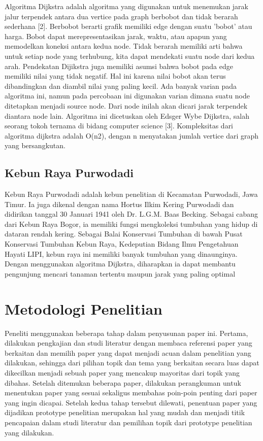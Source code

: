\documentclass[conference]{IEEEtran}
\begin{document}
Algoritma Dijkstra adalah algoritma yang digunakan untuk
menemukan jarak jalur terpendek antara dua vertice pada
graph berbobot dan tidak berarah sederhana [2]. Berbobot
berarti grafik memiliki edge dengan suatu ’bobot’ atau harga.
Bobot dapat merepresentasikan jarak, waktu, atau apapun
yang memodelkan koneksi antara kedua node. Tidak berarah
memiliki arti bahwa untuk setiap node yang terhubung, kita
dapat mendekati suatu node dari kedua arah. Pendekatan Dijikstra
juga memiliki asumsi bahwa bobot pada edge memiliki
nilai yang tidak negatif. Hal ini karena nilai bobot akan
terus dibandingkan dan diambil nilai yang paling kecil. Ada
banyak varian pada algoritma ini, namun pada percobaan
ini digunakan varian dimana suatu node ditetapkan menjadi
source node. Dari node inilah akan dicari jarak terpendek
diantara node lain. Algoritma ini dicetuskan oleh Edsger
Wybe Dijkstra, salah seorang tokoh ternama di bidang computer
science [3]. Kompleksitas dari algoritma dijkstra adalah
O(n2), dengan n menyatakan jumlah vertice dari graph yang
bersangkutan.

\subsection{Kebun Raya Purwodadi}

Kebun Raya Purwodadi adalah kebun penelitian di Kecamatan
Purwodadi, Jawa Timur. Ia juga dikenal dengan nama
Hortus Ilkim Kering Purwodadi dan didirikan tanggal 30 Januari
1941 oleh Dr. L.G.M. Baas Becking. Sebagai cabang dari
Kebun Raya Bogor, ia memiliki fungsi mengkoleksi tumbuhan
yang hidup di dataran rendah kering. Sebagai Balai Konservasi
Tumbuhan di bawah Pusat Konservasi Tumbuhan Kebun Raya,
Kedeputian Bidang Ilmu Pengetahuan Hayati LIPI, kebun raya
ini memiliki banyak tumbuhan yang dinaunginya. Dengan
menggunakan algoritma Dijkstra, diharapkan ia dapat membantu
pengunjung mencari tanaman tertentu maupun jarak
yang paling optimal



\section{Metodologi Penelitian}
Peneliti menggunakan beberapa tahap dalam penyusunan
paper ini. Pertama, dilakukan pengkajian dan studi literatur
dengan membaca referensi paper yang berkaitan dan memilih
paper yang dapat menjadi acuan dalam penelitian yang dilakukan,
sehingga dari pilihan topik dan tema yang berkaitan
secara luas dapat dikecilkan menjadi sebuah paper yang mencakup
mayoritas dari topik yang dibahas. Setelah ditemukan
beberapa paper, dilakukan perangkuman untuk menentukan
paper yang sesuai sekaligus membahas poin-poin penting
dari paper yang ingin dicapai. Setelah kedua tahap tersebut
dilewati, penentuan paper yang dijadikan prototype penelitian
merupakan hal yang mudah dan menjadi titik pencapaian
dalam studi literatur dan pemilihan topik dari prototype penelitian
yang dilakukan.
\end{document}

